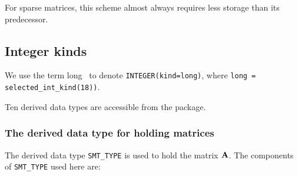 \documentclass{galahad}
\newcommand{\packagename}{LPA}
\newcommand{\fullpackagename}{\libraryname\_\packagename}
\begin{document}
For sparse matrices, this scheme almost always requires less storage than
its predecessor.


\subsection{Integer kinds}\label{Integer kinds}
We use the term
long \integer\ to denote {\tt INTEGER\-(kind=long)}, where
{\tt long = selected\_int\_kind(18))}.





\galtypes
Ten derived data types are accessible from the package.


\subsubsection{The derived data type for holding matrices}\label{typesmt}
The derived data type {\tt SMT\_TYPE} is used to hold the matrix ${\mathbf{A}}$.
The components of {\tt SMT\_TYPE} used here are:
\end{document}
